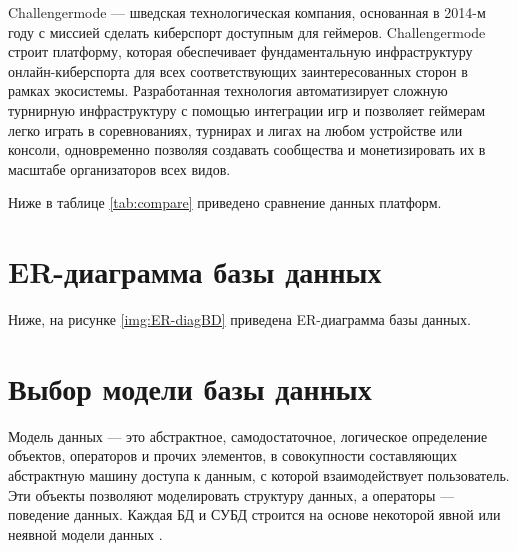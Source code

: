 
Challengermode — шведская технологическая компания, основанная в 2014-м году с миссией сделать киберспорт доступным для геймеров. Challengermode строит платформу, которая обеспечивает фундаментальную инфраструктуру онлайн-киберспорта для всех соответствующих заинтересованных сторон в рамках экосистемы. 
Разработанная технология автоматизирует сложную турнирную инфраструктуру с помощью интеграции игр и позволяет геймерам легко играть в соревнованиях, турнирах и лигах на любом устройстве или консоли, одновременно позволяя создавать сообщества и монетизировать их в масштабе организаторов всех видов.


Ниже в таблице \ref{tab:compare} приведено сравнение данных платформ.

\begin{table}[H]
	\caption{Анализ аналогичных решений}
	\label{tab:compare}
	\centering
\end{table}

\newpage
\section{ER-диаграмма базы данных}
Ниже, на рисунке \ref{img:ER-diagBD} приведена ER-диаграмма базы данных.


\section{Выбор модели базы данных}
Модель данных — это абстрактное, самодостаточное, логическое определение объектов, операторов и прочих элементов, в совокупности составляющих абстрактную машину доступа к данным, с которой взаимодействует пользователь. Эти объекты позволяют моделировать структуру данных, а операторы — поведение данных. Каждая БД и СУБД строится на основе некоторой явной или неявной модели данных \cite{Deit book}.

